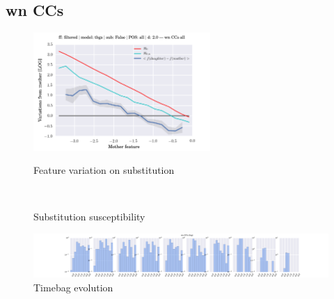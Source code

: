 \subsection{wn CCs}
\begin{figure}[h!]
    \centering
    \includegraphics[width=0.6\textwidth]{images/feature-cards/wn_CCs/feature_variations.png}
    \caption{Feature variation on substitution}
	~
	\caption{Substitution susceptibility}
    \includegraphics[width=\textwidth]{images/feature-cards/wn_CCs/timebags_evolution-hist.png}
	\caption{Timebag evolution}
\end{figure}


\clearpage
